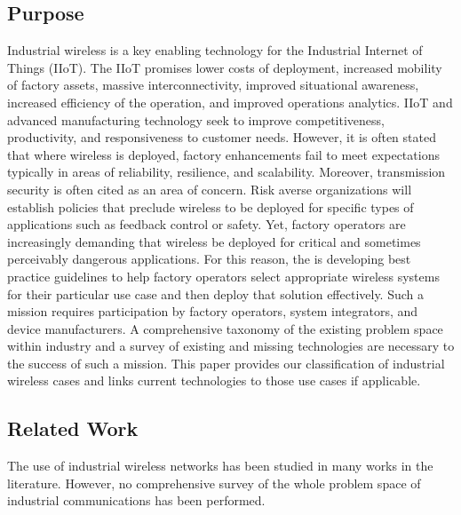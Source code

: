     \subsection{Purpose}
    Industrial wireless is a key enabling technology for the Industrial Internet of Things (IIoT).  The IIoT promises lower costs of deployment, increased mobility of factory assets, massive interconnectivity, improved situational awareness, increased efficiency of the operation, and improved operations analytics.  IIoT and advanced manufacturing technology seek to improve competitiveness, productivity, and responsiveness to customer needs. However, it is often stated that where wireless is deployed, factory enhancements fail to meet expectations typically in areas of reliability, resilience, and scalability. Moreover, transmission security is often cited as an area of concern. Risk averse organizations will establish policies that preclude wireless to be deployed for specific types of applications such as feedback control or safety. Yet, factory operators are increasingly demanding that wireless be deployed for critical and sometimes perceivably dangerous applications.  For this reason, the
\iftoggle{blindcopy}{(BLIND COPY - NAME REMOVED)}{National Institute of Standards and Technology (NIST)} 
is developing best practice guidelines to help factory operators select appropriate wireless systems for their particular use case and then deploy that solution effectively.  Such a mission requires participation by factory operators, system integrators, and device manufacturers. A comprehensive taxonomy of the existing problem space within industry and a survey of existing and missing technologies are necessary to the success of such a mission. This paper provides our classification of industrial wireless cases and links current technologies to those use cases if applicable. 
    
    \subsection{Related Work}
The use of industrial wireless networks has been studied in many works in the literature. However, no comprehensive survey of the whole problem space of industrial communications has been performed.

